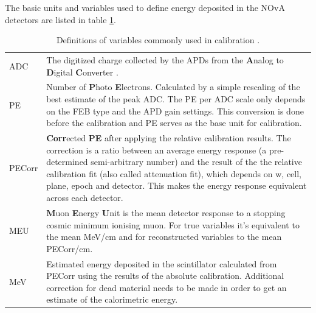 \documentclass[12pt,a4paper]{article}
\begin{document}

The basic units and variables used to define energy deposited in the NOvA detectors are listed in table \ref{tabCalibrationVars}.
\begin{table}[!ht]
\centering
\def\arraystretch{1.4}
\begin{tabular}{m{} m{}}
ADC & The digitized charge collected by the APDs from the \textbf{A}nalog to \textbf{D}igital \textbf{C}onverter \cite{NOVA-doc-13518}.\\
PE & Number of \textbf{P}hoto \textbf{E}lectrons. Calculated by a simple rescaling of the best estimate of the peak ADC. The PE per ADC scale only depends on the FEB type and the APD gain settings. This conversion is done before the calibration and PE serves as the base unit for calibration.\\
PECorr & \textbf{Corr}ected \textbf{PE} after applying the relative calibration results. The correction is a ratio between an average energy response (a pre-determined semi-arbitrary number) and the result of the the relative calibration fit (also called attenuation fit), which depends on w, cell, plane, epoch and detector. This makes the energy response equivalent across each detector.\\
MEU & \textbf{M}uon \textbf{E}nergy \textbf{U}nit is the mean detector response to a stopping cosmic minimum ionising muon.  For true variables it's equivalent to the mean MeV/cm and for reconstructed variables to the mean PECorr/cm.\\
MeV & Estimated energy deposited in the scintillator calculated from PECorr using the results of the absolute calibration. Additional correction for dead material needs to be made in order to get an estimate of the calorimetric energy.
\end{tabular}
\caption{Definitions of variables commonly used in calibration \cite{NOVA-doc-13579,NOVA-doc-7410}.}
\label{tabCalibrationVars}
\end{table}
\end{document}
